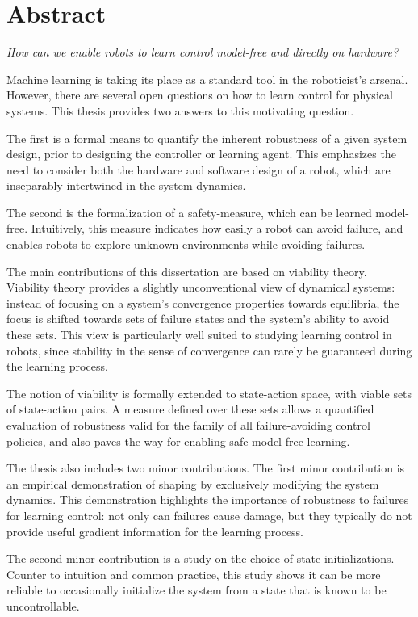 
\chapter*{Abstract}
\emph{How can we enable robots to learn control model-free and directly on hardware?} \par
Machine learning is taking its place as a standard tool in the roboticist's arsenal. However, there are several open questions on how to learn control for physical systems. This thesis provides two answers to this motivating question. \par
The first is a formal means to quantify the inherent robustness of a given system design, prior to designing the controller or learning agent. This emphasizes the need to consider both the hardware and software design of a robot, which are inseparably intertwined in the system dynamics. \par
The second is the formalization of a safety-measure, which can be learned model-free. Intuitively, this measure indicates how easily a robot can avoid failure, and enables robots to explore unknown environments while avoiding failures. \par
The main contributions of this dissertation are based on viability theory. Viability theory provides a slightly unconventional view of dynamical systems: instead of focusing on a system's convergence properties towards equilibria, the focus is shifted towards sets of failure states and the system's ability to avoid these sets. This view is particularly well suited to studying learning control in robots, since stability in the sense of convergence can rarely be guaranteed during the learning process. \par
The notion of viability is formally extended to state-action space, with viable sets of state-action pairs. A measure defined over these sets allows a quantified evaluation of robustness valid for the family of all failure-avoiding control policies, and also paves the way for enabling safe model-free learning. \par
The thesis also includes two minor contributions. The first minor contribution is an empirical demonstration of shaping by exclusively modifying the system dynamics. This demonstration highlights the importance of robustness to failures for learning control: not only can failures cause damage, but they typically do not provide useful gradient information for the learning process. \par
The second minor contribution is a study on the choice of state initializations. Counter to intuition and common practice, this study shows it can be more reliable to occasionally initialize the system from a state that is known to be uncontrollable. 